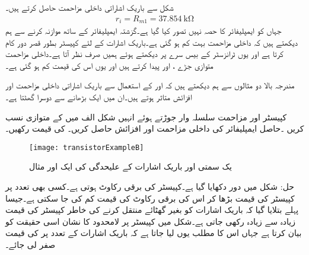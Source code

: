 شکل سے باریک اشاراتی داخلی مزاحمت حاصل کرتے ہیں۔
\begin{align*}
r_i=R_{m1}=\SI{37.854}{\kilo \ohm}
\end{align*}
جہاں  کو ایمپلیفائر کا حصہ نہیں تصور کیا گیا ہے۔گزشتہ ایمپلیفائر کے ساتھ موازنہ کرنے سے ہم دیکھتے ہیں کہ داخلی مزاحمت بہت کم ہو گئی ہے۔باریک اشارات کے لئے کپیسٹر  بطور قصر دور کام کرتا ہے اور یوں ٹرانزسٹر کے بیس سرے پر دیکھتے ہوئے ہمیں صرف  نظر آتا ہے۔داخلی مزاحمت متوازی جڑے ، اور  پیدا کرتے ہیں اور یوں اس کی قیمت کم ہو گئی ہے۔

مندرجہ بالا دو مثالوں سے ہم دیکھتے ہیں کہ  اور  کے استعمال سے باریک اشاراتی داخلی مزاحمت   اور افزائش   متاثر ہوتے ہیں۔ان میں ایک بڑھانے سے دوسرا گھٹتا ہے۔ 



کپیسٹر   اور مزاحمت   سلسلہ وار جوڑتے ہوئے انہیں شکل  الف میں   کے متوازی نسب کریں ۔حاصل ایمپلیفائر کی داخلی مزاحمت  اور افزائش   حاصل کریں۔  کی قیمت   رکھیں۔
\begin{figure}
\centering
\texttt{[image: transistorExampleB]}
\caption{یک سمتی اور باریک اشارات کے علیحدگی کی ایک اور مثال}
\label{شکل_مثال_کا_دور_ب}
\end{figure}
حل: شکل   میں دور دکھایا گیا ہے۔کپیسٹر کی برقی رکاوٹ  ہوتی ہے۔کسی بھی تعدد پر کپیسٹر کی قیمت بڑھا کر اس کی برقی رکاوٹ کی قیمت کم کی جا سکتی ہے۔جیسا پہلے بتلایا گیا کہ باریک اشارات کو بغیر گھٹائے منتقل کرنے کی خاطر کپیسٹر کی قیمت زیادہ سے زیادہ رکھی جاتی ہے۔شکل میں کپیسٹر پر لامحدود کا نشان  اسی حقیقت کو بیان کرتا ہے جہاں اس کا مطلب یوں لیا جاتا ہے کہ باریک اشارات کے تعدد پر  کی قیمت صفر لی جائے۔

